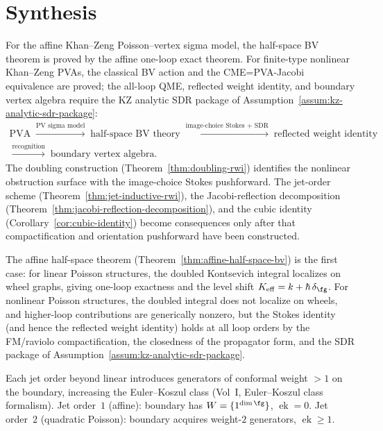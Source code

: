\section{Synthesis}

For the affine Khan--Zeng Poisson--vertex sigma model, the half-space
BV theorem is proved by the affine one-loop exact theorem. For
finite-type nonlinear Khan--Zeng PVAs, the classical BV action and the
CME=PVA-Jacobi equivalence are proved; the all-loop QME, reflected
weight identity, and boundary vertex algebra require the KZ analytic
SDR package of Assumption~\ref{assum:kz-analytic-sdr-package}:
\begin{gather*}
\text{PVA}
\;\xrightarrow{\text{PV sigma model}}\;
\text{half-space BV theory}
\;\xrightarrow{\text{image-choice Stokes + SDR}}\;
\text{reflected weight identity}\\
\xrightarrow{\text{recognition}}\;
\text{boundary vertex algebra}.
\end{gather*}
The doubling construction (Theorem~\ref{thm:doubling-rwi}) identifies
the nonlinear obstruction surface with the image-choice Stokes
pushforward. The jet-order scheme (Theorem~\ref{thm:jet-inductive-rwi}),
the Jacobi-reflection
decomposition (Theorem~\ref{thm:jacobi-reflection-decomposition}),
and the cubic identity (Corollary~\ref{cor:cubic-identity}) become
consequences only after that compactification and orientation
pushforward have been constructed.

The affine half-space theorem (Theorem~\ref{thm:affine-half-space-bv})
is the first case: for linear Poisson structures, the doubled
Kontsevich integral localizes on wheel graphs, giving one-loop
exactness and the level shift $K_{\mathrm{eff}}=k+\hbar\,\delta_\fg$.
For nonlinear Poisson structures, the doubled integral does not
localize on wheels, and higher-loop contributions are generically
nonzero, but the Stokes identity (and hence the reflected weight
identity) holds at all loop orders by the FM/raviolo compactification,
the closedness of the propagator form, and the SDR package of
Assumption~\ref{assum:kz-analytic-sdr-package}.

\begin{remark}%
\label{rem:jet-order-ek}%
Each jet order beyond linear introduces generators of
conformal weight $> 1$ on the boundary, increasing the
Euler--Koszul class (Vol~I,
Euler--Koszul class formalism).
Jet order~$1$ (affine): boundary has
$W = \{1^{\dim\fg}\}$, $\operatorname{ek} = 0$.
Jet order~$2$ (quadratic Poisson): boundary acquires
weight-$2$ generators, $\operatorname{ek} \geq 1$.
\end{remark}

